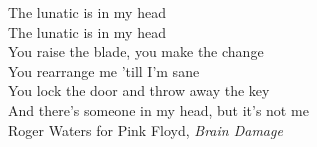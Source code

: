 \thispagestyle{empty}
\begin{flushright}

\vspace*{60mm}

The lunatic is in my head\\
The lunatic is in my head \\
You raise the blade, you make the change\\
You rearrange me 'till I'm sane\\
You lock the door and throw away the key\\
And there's someone in my head, but it's not me\\

\vspace{4mm}
Roger Waters for Pink Floyd, \textit{Brain Damage}\\




\end{flushright}